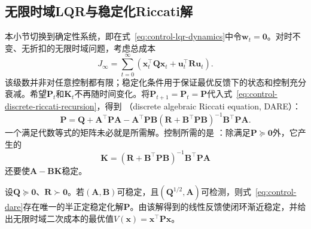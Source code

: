 \subsection{无限时域LQR与稳定化Riccati解}
本小节切换到确定性系统，即在式~\eqref{eq:control-lqr-dynamics}中令$\bm{w}_t=\bm{0}$。对时不变、无折扣的无限时域问题，考虑总成本
\[
  J_{\infty}
  =
  \sum_{t=0}^{\infty}
  \left(
    \bm{x}_t^{\top}\bm{Q}\bm{x}_t
    +
    \bm{u}_t^{\top}\bm{R}\bm{u}_t
  \right).
\]
该级数并非对任意控制都有限；稳定化条件用于保证最优反馈下的状态和控制充分衰减。希望$\bm{P}_t$和$\bm{K}_t$不再随时间变化。将$\bm{P}_{t+1}=\bm{P}_t=\bm{P}$代入式~\eqref{eq:control-discrete-riccati-recursion}，得到
（discrete algebraic Riccati equation, DARE）：
\begin{equation}
  \bm{P}
  =
  \bm{Q}
  +
  \bm{A}^{\top}\bm{P}\bm{A}
  -
  \bm{A}^{\top}\bm{P}\bm{B}
  (\bm{R}+\bm{B}^{\top}\bm{P}\bm{B})^{-1}
  \bm{B}^{\top}\bm{P}\bm{A}.
  \label{eq:control-dare}
\end{equation}
一个满足代数等式的矩阵未必就是所需解。控制所需的是
：除满足$\bm{P}\succeq\bm{0}$外，它产生的
\[
  \bm{K}
  =
  (\bm{R}+\bm{B}^{\top}\bm{P}\bm{B})^{-1}
  \bm{B}^{\top}\bm{P}\bm{A}
\]
还要使$\bm{A}-\bm{B}\bm{K}$稳定。
\begin{theorem}[无限时域LQR的稳定化解]
\label{thm:control-infinite-horizon-lqr}
设$\bm{Q}\succeq\bm{0}$、$\bm{R}\succ\bm{0}$。若$(\bm{A},\bm{B})$可稳定，且$(\bm{Q}^{1/2},\bm{A})$可检测，则式~\eqref{eq:control-dare}存在唯一的半正定稳定化解$\bm{P}$。由该解得到的线性反馈使闭环渐近稳定，并给出无限时域二次成本的最优值$V(\bm{x})=\bm{x}^{\top}\bm{P}\bm{x}$。
\end{theorem}
